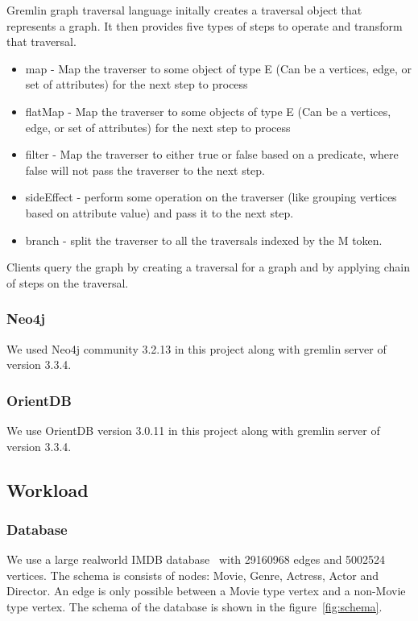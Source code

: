 Gremlin graph traversal language initally creates a traversal object that represents a graph. It then provides five types of steps to operate and transform  that traversal. 

\begin{itemize}
\item map - Map the traverser to some object of type E (Can be a vertices, edge, or set of attributes) for the next step to process
\item flatMap - Map the traverser to some objects of type E (Can be a vertices, edge, or set of attributes) for the next step to process
\item filter - Map the traverser to either true or false based on a predicate, where false will not pass the traverser to the next step.
\item sideEffect - perform some operation on the traverser (like grouping vertices based on attribute value) and pass it to the next step. 
\item branch - split the traverser to all the traversals indexed by the M token.
\end{itemize}

Clients query the graph by creating a traversal for a graph and by applying chain of steps on the traversal.

\subsubsection{Neo4j}

We used Neo4j community 3.2.13 in this project along with gremlin server of version 3.3.4.

\subsubsection{OrientDB}

We use OrientDB version 3.0.11 in this project along with gremlin server of version 3.3.4.

\subsection{Workload}

\subsubsection{Database}

We use a large realworld IMDB database~\cite{IMDb96:online} with 29160968 edges and 5002524 vertices. The schema is consists of nodes: Movie, Genre,
Actress, Actor and Director. An edge is only possible between a Movie type vertex and a non-Movie type vertex. 
The schema of the database is shown in the figure~\ref{fig:schema}. 

